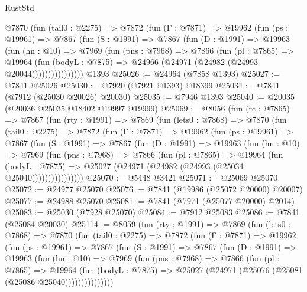 \begin{lexlean}{RustStd}
\begin{coremodule}
{\begin{coremodule}
{{{{{{{{{{{{{{{{{{{{{{{{{{{{{{{{{{{{{{{{{{{{{{{{{{{{{{          @7870
            (fun (tail0 : @2275) =>
            @7872
              (fun (Γ : @7871) =>
              @19962
                (fun (ps : @19961) =>
                @7867
                  (fun (S : @1991) =>
                  @7867
                    (fun (D : @1991) =>
                    @19963
                      (fun (hn : @10) =>
                      @7969
                        (fun (pns : @7968) =>
                        @7866
                          (fun (pl : @7865) =>
                          @19964
                            (fun (bodyL : @7875) =>
                            @24966 (@24971 (@24982 (@24993 @20044))))))))))))))))
    @1393
@25026 := @24964 (@7858 @1393)
@25027 := @7841 @25026
@25030 := @7920 (@7921 @1393) @18399
@25034 := @7841 (@7912 (@25030 @20026) @20030)
@25035 := @7946 @1393
@25040 := @20035 (@20036 @25035 @18402 @19997 @19999)
@25069 := @8056
    (fun (rc : @7865) =>
    @7867
      (fun (rty : @1991) =>
      @7869
        (fun (lets0 : @7868) =>
        @7870
          (fun (tail0 : @2275) =>
          @7872
            (fun (Γ : @7871) =>
            @19962
              (fun (ps : @19961) =>
              @7867
                (fun (S : @1991) =>
                @7867
                  (fun (D : @1991) =>
                  @19963
                    (fun (hn : @10) =>
                    @7969
                      (fun (pns : @7968) =>
                      @7866
                        (fun (pl : @7865) =>
                        @19964
                          (fun (bodyL : @7875) =>
                          @25027 (@24971 (@24982 (@24993 (@25034 @25040))))))))))))))))
@25070 := @5448 @3421
@25071 := @25069 @25070
@25072 := @24977 @25070
@25076 := @7841 (@19986 (@25072 @20000) @20007)
@25077 := @24988 @25070
@25081 := @7841 (@7971 (@25077 @20000) @2014)
@25083 := @25030 (@7928 @25070)
@25084 := @7912 @25083
@25086 := @7841 (@25084 @20030)
@25114 := @8059
    (fun (rty : @1991) =>
    @7869
      (fun (lets0 : @7868) =>
      @7870
        (fun (tail0 : @2275) =>
        @7872
          (fun (Γ : @7871) =>
          @19962
            (fun (ps : @19961) =>
            @7867
              (fun (S : @1991) =>
              @7867
                (fun (D : @1991) =>
                @19963
                  (fun (hn : @10) =>
                  @7969
                    (fun (pns : @7968) =>
                    @7866
                      (fun (pl : @7865) =>
                      @19964
                        (fun (bodyL : @7875) =>
                        @25027 (@24971 (@25076 (@25081 (@25086 @25040)))))))))))))))
}}}}}}}}}}}}}}}}}}}}}}}}}}}}}}}}}}}}}}}}}}}}}}}}}}}}}}
\end{coremodule}}
\end{coremodule}
\end{lexlean}
